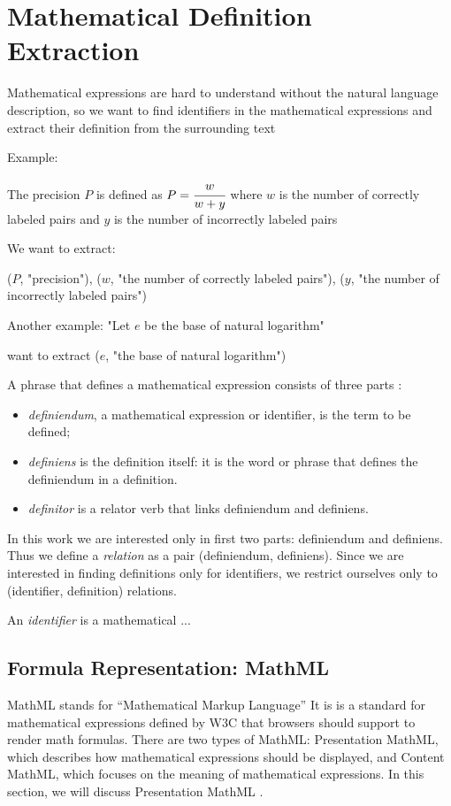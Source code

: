 \section{Mathematical Definition Extraction} \label{section:definitionextraction}
Mathematical expressions are hard to understand without the natural language description,
so we want to find identifiers in the mathematical expressions and extract their
definition from the surrounding text

Example:

The precision $P$ is defined as $P = \cfrac{w}{w + y}$ where $w$ is the number of
correctly labeled pairs and $y$ is the number of incorrectly labeled pairs

We want to extract:

($P$, "precision"),
($w$, "the number of correctly labeled pairs"),
($y$, "the number of incorrectly labeled pairs")

Another example: "Let $e$ be the base of natural logarithm"

want to extract ($e$, "the base of natural logarithm")


A phrase that defines a mathematical expression consists of three parts \cite{kristianto2012extracting}:

\begin{itemize}
  \item \emph{definiendum}, a mathematical expression or identifier, is the term to be defined;
  \item \emph{definiens} is the definition itself: it is the word or phrase that defines the definiendum in a definition.
  \item \emph{definitor} is a relator verb that links definiendum and definiens.
\end{itemize}

In this work we are interested only in first two parts: definiendum and definiens.
Thus we define a \emph{relation} as a pair (definiendum, definiens). Since we are
interested in finding definitions only for identifiers, we restrict ourselves only
to (identifier, definition) relations.


An \emph{identifier} is a mathematical ...


\subsection{Formula Representation: MathML}

MathML \cite{mathml} stands for ``Mathematical Markup Language''
It is is a standard for mathematical
expressions defined by W3C that browsers should support to render math
formulas. There are two types of MathML: Presentation MathML, which describes
how mathematical expressions should be displayed, and Content MathML, which
focuses on the meaning of mathematical expressions. In this section, we will discuss
Presentation MathML .


